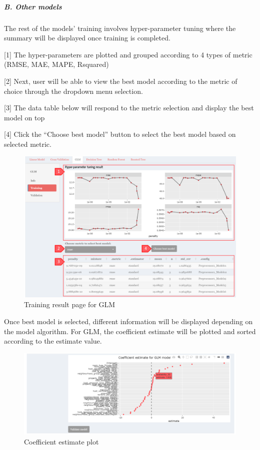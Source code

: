 \documentclass[
  12pt,
]{article}
\begin{document}
\hypertarget{b.-other-models}{%
\subparagraph{B. Other models}\label{b.-other-models}}

The rest of the models' training involves hyper-parameter tuning where
the summary will be displayed once training is completed.

{[}1{]} The hyper-parameters are plotted and grouped according to 4
types of metric (RMSE, MAE, MAPE, Rsquared)

{[}2{]} Next, user will be able to view the best model according to the
metric of choice through the dropdown menu selection.

{[}3{]} The data table below will respond to the metric selection and
display the best model on top

{[}4{]} Click the ``Choose best model'' button to select the best model
based on selected metric.

\begin{figure}[H]

{\centering \includegraphics[width=0.95\linewidth]{images/mdltrain4} 

}

\caption{Training result page for GLM}\label{fig:unnamed-chunk-21}
\end{figure}

Once best model is selected, different information will be displayed
depending on the model algorithm. For GLM, the coefficient estimate will
be plotted and sorted according to the estimate value.

\begin{figure}[H]

{\centering \includegraphics[width=0.95\linewidth]{images/mdltrain5} 

}

\caption{Coefficient estimate plot}\label{fig:unnamed-chunk-22}
\end{figure}
\end{document}
